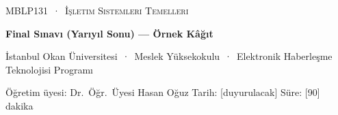 \documentclass[11pt,a4paper]{article}
\begin{document}
\setlength{\emergencystretch}{3em}\sloppy
{}
\setlength{\parskip}{0.35em}
\newcommand{\pts}[1]{\hfill\textcolor{mintdeep}{\textbf{[#1~puan]}}}
\newcommand{\ans}[1]{\par\smallskip\noindent\begin{tikzpicture}\draw[muted!60,rounded corners=2pt] (0,0) rectangle (\linewidth,#1);\end{tikzpicture}\par\medskip}
\newcommand{\ganttgrid}[2]{\par\noindent\begin{tikzpicture}[x=0.7cm]
\node[anchor=east,font=\small\bfseries] at (-0.2,0.31) {#2};
\draw[muted!70] (0,0) rectangle (#1,0.62);
\foreach \t in {0,...,#1} {\draw[muted!70] (\t,0) -- (\t,-0.1) node[below,font=\scriptsize,text=muted,inner sep=1pt] {\t};}
\end{tikzpicture}\par\smallskip}
\newcommand{\frametable}[1]{\begin{tabular}{@{}l|*{12}{>{\centering\arraybackslash}p{0.6cm}|}@{}}
\multicolumn{13}{@{}l}{\textbf{#1}}\\ \hline
başv. & 5 & 4 & 1 & 5 & 0 & 5 & 4 & 0 & 2 & 1 & 0 & 1 \\ \hline
çr.\ 0 &&&&&&&&&&&& \\ \hline
çr.\ 1 &&&&&&&&&&&& \\ \hline
çr.\ 2 &&&&&&&&&&&& \\ \hline
hata &&&&&&&&&&&& \\ \hline
\end{tabular}}

\thispagestyle{empty}
\begin{tcolorbox}[enhanced,colback=dark,colframe=dark,arc=0pt,boxrule=0pt,
  left=18pt,right=18pt,top=14pt,bottom=14pt,coltext=white]
{\small\color{mint}\textsc{MBLP131 \,·\, İşletim Sistemleri Temelleri}}\par\smallskip
{\headfont\fontsize{22}{26}\selectfont\bfseries Final Sınavı (Yarıyıl Sonu) --- Örnek Kâğıt}\par\smallskip
{\small İstanbul Okan Üniversitesi \,·\, Meslek Yüksekokulu \,·\, Elektronik Haberleşme Teknolojisi Programı}\par
{\small Öğretim üyesi: Dr.\ Öğr.\ Üyesi Hasan Oğuz \quad Tarih: [duyurulacak] \quad Süre: [90] dakika}
\end{tcolorbox}
\end{document}
